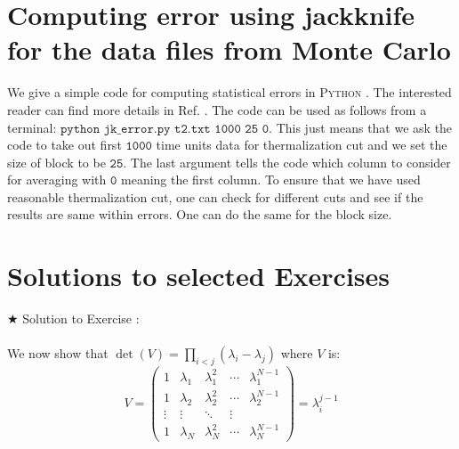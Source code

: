 \documentclass[11pt]{article}
\newcommand{\PY}{\textsc{Python }}
\begin{document}
\begin{footnotesize} 
	\begin{mdframed}[backgroundcolor=mauve!3] 
			
	\end{mdframed} 
\end{footnotesize}


\section{Computing error using jackknife for the data files from Monte Carlo}

We give a simple code for computing statistical errors in \PY. 
The interested reader can find more details in Ref. \cite{2012arXiv1210.3781Y}. 
The code can be used as follows from a terminal:
$\texttt{python jk\_error.py t2.txt 1000 25 0}$. 
This just means that we ask the code to take out first $\texttt{1000}$
time units data for thermalization cut and we set
the size of block to be $\texttt{25}$. The last argument tells the code
which column to consider for averaging with $\texttt{0}$ 
meaning the first column. To ensure that we have used reasonable
thermalization cut, one can check for different cuts and see if the results 
are same within errors. One can do the same for the block size. 

\begin{footnotesize} 
	\begin{mdframed}[backgroundcolor=mauve!3] 
			
	\end{mdframed} 
\end{footnotesize}



\section{Solutions to selected Exercises} 

\noindent $\bigstar$ Solution to Exercise :
\\ \\ 
We now show that $\det(V) = \prod_{i<j} (\lambda_i - \lambda_j)$ where $V$ is: 
\begin{equation*}
	V = 
	\begin{pmatrix}
		1 & \lambda_1 & \lambda_{1}^{2} & \cdots & \lambda_{1}^{N-1} \\
		1 & \lambda_2 & \lambda_{2}^{2} & \cdots & \lambda_{2}^{N-1} \\ 
		\vdots  & \vdots  & \ddots & \vdots  \\
		1 & \lambda_N & \lambda_{N}^{2} & \cdots & \lambda_{N}^{N-1} 
	\end{pmatrix} = \lambda_{i}^{j-1} 
\end{equation*}
\end{document}
